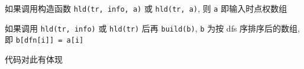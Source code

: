 如果调用构造函数 \verb|hld(tr, info, a)| 或 \verb|hld(tr, a)|, 则 \verb|a| 即输入时点权数组

如果调用 \verb|hld(tr, info)| 或 \verb|hld(tr)| 后再 \verb|build(b)|, \verb|b| 为按 dfs 序排序后的数组, 即 \verb|b[dfn[i]] = a[i]|

代码对此有体现